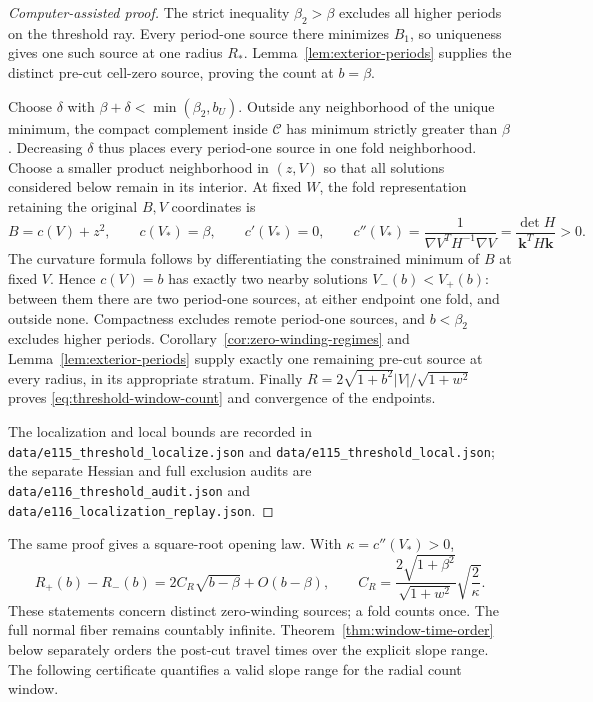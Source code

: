 \documentclass[11pt,a4paper]{article}
\theoremstyle{remark}\newtheorem{remark}[theorem]{Remark}
\begin{document}
\begin{proof}[Computer-assisted proof]
The strict inequality $\beta_2>\beta$ excludes all higher periods
on the threshold ray. Every period-one source there minimizes $B_1$,
so uniqueness gives one such source at one radius $R_*$.
Lemma~\ref{lem:exterior-periods} supplies the distinct pre-cut
cell-zero source, proving the count at $b=\beta$.

Choose $\delta$ with $\beta+\delta<\min(\beta_2,b_U)$.
Outside any neighborhood of the unique minimum, the compact
complement inside $\mathcal C$ has minimum strictly greater than
$\beta$. Decreasing $\delta$ thus places every period-one source
in one fold neighborhood. Choose a smaller product neighborhood in
$(z,V)$ so that all solutions considered below remain in its interior.
At fixed $W$, the fold representation retaining the original $B,V$
coordinates is
\[
 B=c(V)+z^2,\qquad c(V_*)=\beta,\qquad c'(V_*)=0,
 \qquad c''(V_*)=\frac{1}{\nabla V^T H^{-1}\nabla V}
 =\frac{\det H}{\mathbf k^TH\mathbf k}>0.
\]
The curvature formula follows by differentiating the constrained
minimum of $B$ at fixed $V$. Hence $c(V)=b$ has exactly two nearby
solutions $V_-(b)<V_+(b)$: between them there are two period-one
sources, at either endpoint one fold, and outside none. Compactness
excludes remote period-one sources, and $b<\beta_2$ excludes higher
periods. Corollary~\ref{cor:zero-winding-regimes} and
Lemma~\ref{lem:exterior-periods} supply exactly one remaining
pre-cut source at every radius, in its appropriate stratum.
Finally $R=2\sqrt{1+b^2}|V|/\sqrt{1+w^2}$ proves
\eqref{eq:threshold-window-count} and convergence of the endpoints.

The localization and local bounds are recorded in
\nolinkurl{data/e115_threshold_localize.json} and
\nolinkurl{data/e115_threshold_local.json}; the separate Hessian
and full exclusion audits are
\nolinkurl{data/e116_threshold_audit.json} and
\nolinkurl{data/e116_localization_replay.json}.
\end{proof}

The same proof gives a square-root opening law. With
$\kappa=c''(V_*)>0$,
\[
 R_+(b)-R_-(b)=2C_R\sqrt{b-\beta}+O(b-\beta),\qquad
 C_R=\frac{2\sqrt{1+\beta^2}}{\sqrt{1+w^2}}\sqrt{\frac2\kappa}.
\]
These statements concern distinct zero-winding sources; a fold counts
once. The full normal fiber remains countably infinite.
Theorem~\ref{thm:window-time-order} below separately orders the post-cut
travel times over the explicit slope range. The following certificate quantifies
a valid slope range for the radial count window.
\end{document}
